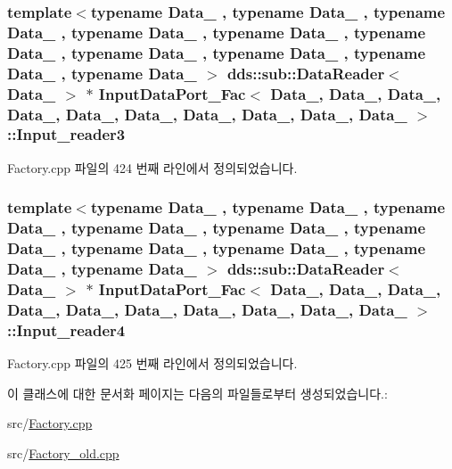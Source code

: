 \subsubsection[{\texorpdfstring{Input\+\_\+reader3}{Input_reader3}}]{\setlength{\rightskip}{0pt plus 5cm}template$<$typename Data\+\_ , typename Data\+\_ , typename Data\+\_ , typename Data\+\_ , typename Data\+\_ , typename Data\+\_ , typename Data\+\_ , typename Data\+\_ , typename Data\+\_ , typename Data\+\_ $>$ dds\+::sub\+::\+Data\+Reader$<$ Data\+\_ $>$ $\ast$ {\bf Input\+Data\+Port\+\_\+\+Fac}$<$ Data\+\_, Data\+\_, Data\+\_, Data\+\_, Data\+\_, Data\+\_, Data\+\_, Data\+\_, Data\+\_, Data\+\_ $>$\+::Input\+\_\+reader3}\hypertarget{classInputDataPort__Fac_ac3626a23fa27c43e0a63aa68f022fc2d}{}\label{classInputDataPort__Fac_ac3626a23fa27c43e0a63aa68f022fc2d}


Factory.\+cpp 파일의 424 번째 라인에서 정의되었습니다.

\subsubsection[{\texorpdfstring{Input\+\_\+reader4}{Input_reader4}}]{\setlength{\rightskip}{0pt plus 5cm}template$<$typename Data\+\_ , typename Data\+\_ , typename Data\+\_ , typename Data\+\_ , typename Data\+\_ , typename Data\+\_ , typename Data\+\_ , typename Data\+\_ , typename Data\+\_ , typename Data\+\_ $>$ dds\+::sub\+::\+Data\+Reader$<$ Data\+\_ $>$ $\ast$ {\bf Input\+Data\+Port\+\_\+\+Fac}$<$ Data\+\_, Data\+\_, Data\+\_, Data\+\_, Data\+\_, Data\+\_, Data\+\_, Data\+\_, Data\+\_, Data\+\_ $>$\+::Input\+\_\+reader4}\hypertarget{classInputDataPort__Fac_adfaed3a3a4363088fb1df54b1fb5d6b1}{}\label{classInputDataPort__Fac_adfaed3a3a4363088fb1df54b1fb5d6b1}


Factory.\+cpp 파일의 425 번째 라인에서 정의되었습니다.



이 클래스에 대한 문서화 페이지는 다음의 파일들로부터 생성되었습니다.\+:\begin{DoxyCompactItemize}
\item 
src/\hyperlink{Factory_8cpp}{Factory.\+cpp}\item 
src/\hyperlink{Factory__old_8cpp}{Factory\+\_\+old.\+cpp}\end{DoxyCompactItemize}
